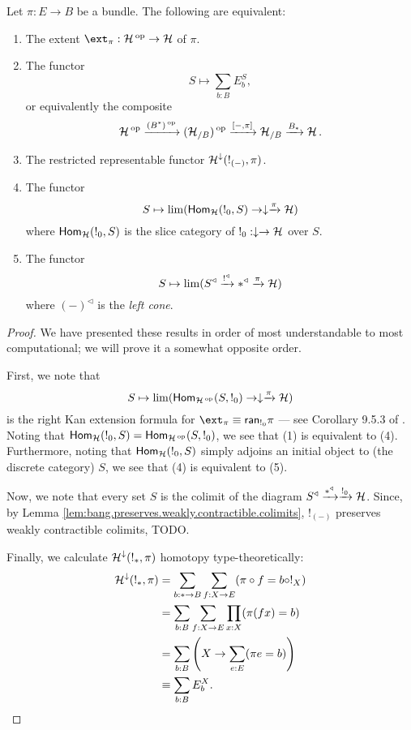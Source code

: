 \begin{prop}\label{prop:set.characterizing.extent}
  Let $\pi : E \to B$ be a bundle. The following are equivalent:
  \begin{enumerate}
  \item The extent $\ext_{\pi} : \Ha\op \to \Ha$ of $\pi$.
  \item The functor
    $$S \mapsto \sum_{b : B} E_b^S,$$
    or equivalently the composite
  $$\operatorname{\mathcal{H}}\operatorname{^\text{op}} \xrightarrow{(B^{\ast})\operatorname{^\text{op}}} (\operatorname{\mathcal{H}}_{/B})\operatorname{^\text{op}} \xrightarrow{[-, \pi]} \operatorname{\mathcal{H}}_{/B}
  \xrightarrow{B_{\ast}} \operatorname{\mathcal{H}}.$$
\item The restricted representable functor
  $\operatorname{\mathcal{H}}^{\downarrow}(!_{(-)}, \pi)$.
\item The functor
  $$S \mapsto \lim(\operatorname{\mathsf{Hom}}_{\operatorname{\mathcal{H}}}(!_0, S) \to \downarrow \xrightarrow{\pi} \operatorname{\mathcal{H}})$$
  where $\operatorname{\mathsf{Hom}}_{\operatorname{\mathcal{H}}}(!_0, S)$ is the slice category of $!_0 : \downarrow \to
  \operatorname{\mathcal{H}}$ over $S$.
\item The functor
  $$S \mapsto \lim(S^{\triangleleft} \xrightarrow{!^{\triangleleft}} \ast^{\triangleleft}
  \xrightarrow{\pi} \operatorname{\mathcal{H}})$$
  where $(-)^{\triangleleft}$ is the \emph{left cone}.
  \end{enumerate}
\end{prop}
\begin{proof}
We have presented these results in order of most understandable to most
computational; we will prove it a somewhat opposite order.

First, we note that 
$$S \mapsto \lim(\operatorname{\mathsf{Hom}}_{\operatorname{\mathcal{H}}\operatorname{^\text{op}}}(S, !_0) \to \downarrow \xrightarrow{\pi} \operatorname{\mathcal{H}})$$
is the right Kan extension formula for $\ext_{\pi} \equiv
\term{ran}_{!_0} \pi$ --- see Corollary 9.5.3 of \cite{RV:Elements}. Noting that $\operatorname{\mathsf{Hom}}_{\operatorname{\mathcal{H}}}(!_0, S) = \operatorname{\mathsf{Hom}}_{\operatorname{\mathcal{H}}\operatorname{^\text{op}}}(S,
!_0)$, we see that (1) is equivalent to (4). Furthermore, noting that
$\operatorname{\mathsf{Hom}}_{\operatorname{\mathcal{H}}}(!_0, S)$ simply adjoins an initial object to (the discrete
category) $S$, we see that (4) is equivalent to (5).

Now, we note that every set $S$ is the colimit of the diagram $S^{\triangleleft}
\xrightarrow{\ast^{\triangleleft}} \xrightarrow{!_0} \operatorname{\mathcal{H}}$. Since, by Lemma \ref{lem:bang.preserves.weakly.contractible.colimits}, $!_{(-)}$
preserves weakly contractible colimits, {\color{red} TODO}.

Finally, we calculate $\operatorname{\mathcal{H}}^{\downarrow}(!_{\ast}, \pi)$ homotopy type-theoretically:
\begin{align*}
\operatorname{\mathcal{H}}^{\downarrow}(!_{\ast}, \pi) &= \sum_{b : \ast \to B} \sum_{f : X \to E}
                                  (\pi \circ f = b \circ !_X)\\
                                &= \sum_{b : B} \sum_{f : X \to E} \prod_{x : X} (\pi (f x) = b) \\
                                &= \sum_{b : B} \left( X \to \sum_{e : E} (\pi e = b) \right) \\
                                  &\equiv \sum_{b : B}E_b^X.
\end{align*}
\end{proof}

